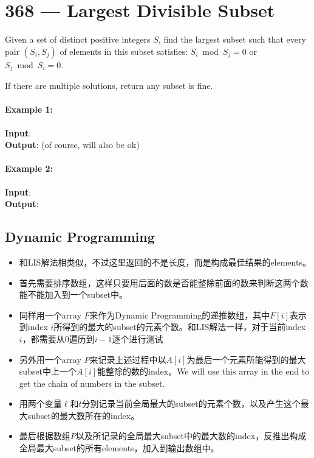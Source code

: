 \section{368 --- Largest Divisible Subset}
Given a set of distinct positive integers $S$, find the largest subset such that every pair $(S_i, S_j)$ of elements in this subset satisfies: $S_i \bmod S_j = 0$ or $S_j \bmod S_i = 0$.
\par
If there are multiple solutions, return any subset is fine.

\paragraph{Example 1:}

\begin{flushleft}
\textbf{Input}: \fcj{[1,2,3]}
\\
\textbf{Output}: \fcj{[1,2]} (of course, \fcj{[1,3]} will also be ok)
\end{flushleft}

\paragraph{Example 2:}

\begin{flushleft}
\textbf{Input}: \fcj{[1,2,4,8]}
\\
\textbf{Output}: \fcj{[1,2,4,8]}
\end{flushleft}

\subsection{Dynamic Programming}
\begin{itemize}
\item 和LIS解法相类似，不过这里返回的不是长度，而是构成最佳结果的elements。
\item 首先需要排序数组，这样只要用后面的数是否能整除前面的数来判断这两个数能不能加入到一个subset中。 
\item 同样用一个array $F$来作为Dynamic Programming的递推数组，其中$F[i]$表示到index $i$所得到的最大的subset的元素个数。和LIS解法一样，对于当前index $i$，都需要从0遍历到$i-1$逐个进行测试
\item 另外用一个array $P$来记录上述过程中以$A[i]$为最后一个元素所能得到的最大subset中上一个$A[i]$能整除的数的index。We will use this array in the end to get the chain of numbers in the subset.
\item 用两个变量$\ell$和$t$分别记录当前全局最大的subset的元素个数，以及产生这个最大subset的最大数所在的index。
\item 最后根据数组$P$以及所记录的全局最大subset中的最大数的index，反推出构成全局最大subset的所有elements，加入到输出数组中。
\end{itemize}


